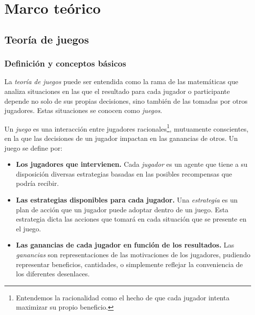 \chapter{Marco teórico}
\justifying



\section{Teoría de juegos}
\subsection*{Definición y conceptos básicos}

La \emph{teoría de juegos}  puede ser
entendida como la rama de las matemáticas que analiza situaciones
en las que el resultado para cada jugador o participante depende no
solo de sus propias decisiones, sino también de las tomadas por otros
jugadores. Estas situaciones se conocen como \emph{juegos}. 

\begin{definition}
  Un \emph{juego} es una interacción entre jugadores
  racionales\footnote{Entendemos la racionalidad como el
  hecho de que cada jugador intenta maximizar su propio
  beneficio.}, mutuamente conscientes, en la que las
  decisiones de un jugador impactan en las ganancias de
  otros. Un juego se define por:
  \begin{itemize}
    \item \textbf{Los jugadores que intervienen.} Cada \emph{jugador}
       es un agente que tiene a su disposición diversas
      estrategias basadas en las posibles recompensas que
      podría recibir.

    \item \textbf{Las estrategias disponibles para cada jugador.}
      Una \emph{estrategia}  es un plan de acción que
      un jugador puede adoptar dentro de un juego. Esta estrategia dicta
      las acciones que tomará en cada situación que se presente
      en el juego.

    \item \textbf{Las ganancias de cada jugador en función de los
      resultados.} Las \emph{ganancias}  son
      representaciones de las motivaciones de los jugadores, pudiendo
      representar beneficios, cantidades, o simplemente reflejar la
      conveniencia de los diferentes desenlaces.
  \end{itemize}
\end{definition}


